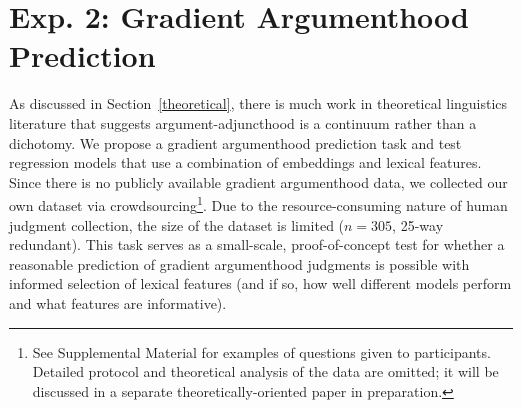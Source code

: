 \documentclass[letterpaper]{article} %
\begin{document}
\section{Exp. 2: Gradient Argumenthood Prediction}
As discussed in Section~\ref{theoretical}, there is much work in theoretical linguistics literature that suggests argument-adjuncthood is a continuum rather than a dichotomy. We propose a gradient argumenthood prediction task and test regression models that use a combination of embeddings and lexical features. Since there is no publicly available gradient argumenthood data, we collected our own dataset via crowdsourcing\footnote{See Supplemental Material for examples of questions given to participants. Detailed protocol and theoretical analysis of the data are omitted; it will be discussed in a separate theoretically-oriented paper in preparation.}. Due to the resource-consuming nature of human judgment collection, the size of the dataset is limited ($n=305$, 25-way redundant). This task serves as a small-scale, proof-of-concept test for whether a reasonable prediction of gradient argumenthood judgments is possible with informed selection of lexical features (and if so, how well different models perform and what features are informative).
\end{document}
